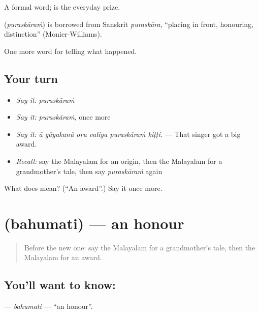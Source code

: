 A formal word;  is the everyday prize.

\begin{cousinweb}
\textbf{} (\emph{puraskāraṁ}) is borrowed from Sanskrit \emph{puraskāra}, \textquotedblleft{}placing in front, honouring, distinction\textquotedblright{} (Monier-Williams).
\end{cousinweb}

\begin{grammarlens}[title={What you've built}]
One more word for telling what happened.
\end{grammarlens}

\subsection*{Your turn}
\begin{itemize}
\raggedright
  \item \emph{Say it:} \emph{puraskāraṁ}
  \item \emph{Say it:} \emph{puraskāraṁ}, once more
  \item \emph{Say it:} \emph{ā gāyakanŭ oru valiya puraskāraṁ kiṭṭi.} — That singer got a big award.
  \item \emph{Recall:} say the Malayalam for an origin, then the Malayalam for a grandmother's tale, then say \emph{puraskāraṁ} again
\end{itemize}

\begin{tcolorbox}[breakable,colback=teal!4,colframe=teal!35!black,title={Before you move on}]
What does  mean? (\textquotedblleft{}An award\textquotedblright{}.) Say it once more.
\end{tcolorbox}
\section[\texorpdfstring{\ml{ബഹുമതി} (bahumati)}{ബഹുമതി (bahumati)}]{ (bahumati) — an honour}

\label{lesson:ML-C396-bahumati}



\begin{quote}
Before the new one: say the Malayalam for a grandmother's tale, then the Malayalam for an award.
\end{quote}

\subsection*{You'll want to know: }
\textbf{} — \emph{bahumati} — \textquotedblleft{}an honour\textquotedblright{}.

